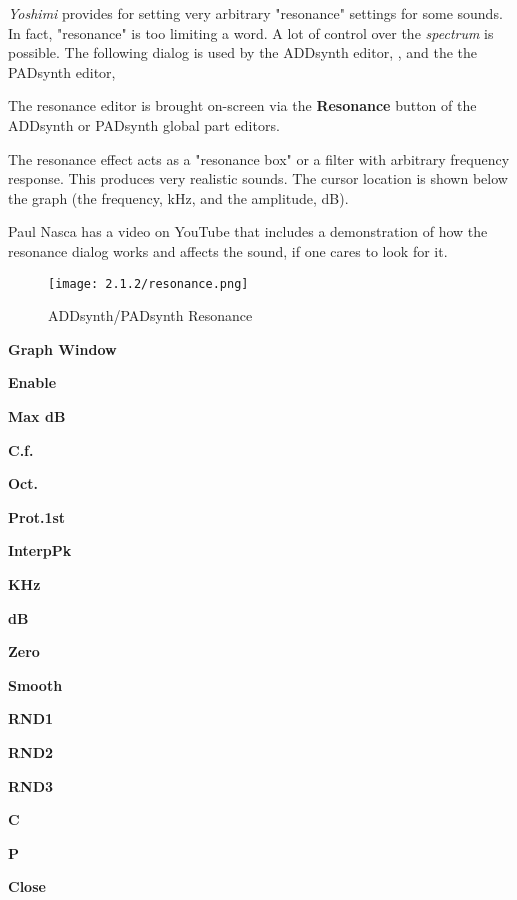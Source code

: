    \textsl{Yoshimi} provides for setting very arbitrary "resonance"
   settings for some sounds.  In fact, "resonance" is too limiting a word.
   A lot of control over the \textsl{spectrum} is possible.
   The following dialog is used by
   the ADDsynth editor,
   , and the
   the PADsynth editor,

   The resonance editor is brought on-screen via the
   \textbf{Resonance} button of the ADDsynth or PADsynth
   global part editors.

   The resonance effect acts as a "resonance box" or a filter with arbitrary
   frequency response. This produces very realistic sounds.
   The cursor location is shown below the graph (the frequency, kHz, and
   the amplitude, dB).

   Paul Nasca has a video on YouTube that includes a demonstration of how
   the resonance dialog works and affects the sound, if one cares to look for
   it.

\begin{figure}[H]
   \centering
   \texttt{[image: 2.1.2/resonance.png]}
   \caption{ADDsynth/PADsynth Resonance}
   \label{fig:addsynth_resonance}
\end{figure}

   \begin{enumber}
      \item \textbf{Graph Window}
      \item \textbf{Enable}
      \item \textbf{Max dB}
      \item \textbf{C.f.}
      \item \textbf{Oct.}
      \item \textbf{Prot.1st}
      \item \textbf{InterpPk}
      \item \textbf{KHz}
      \item \textbf{dB}
      \item \textbf{Zero}
      \item \textbf{Smooth}
      \item \textbf{RND1}
      \item \textbf{RND2}
      \item \textbf{RND3}
      \item \textbf{C}
      \item \textbf{P}
      \item \textbf{Close}
   \end{enumber}

